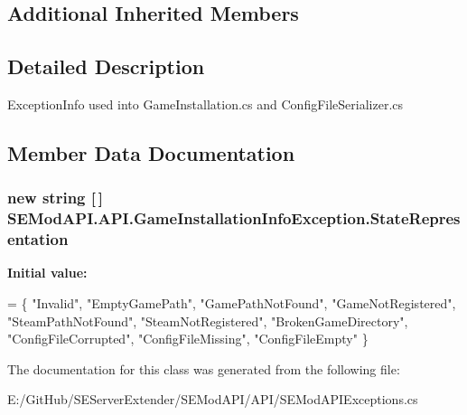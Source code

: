 \subsection*{Additional Inherited Members}


\subsection{Detailed Description}
Exception\+Info used into Game\+Installation.\+cs and Config\+File\+Serializer.\+cs 

\subsection{Member Data Documentation}
\hypertarget{class_s_e_mod_a_p_i_1_1_a_p_i_1_1_game_installation_info_exception_a82eeaa84fbce2623ff4624282c7d0e14}{}
\subsubsection[{State\+Representation}]{\setlength{\rightskip}{0pt plus 5cm}new string \mbox{[}$\,$\mbox{]} S\+E\+Mod\+A\+P\+I.\+A\+P\+I.\+Game\+Installation\+Info\+Exception.\+State\+Representation}\label{class_s_e_mod_a_p_i_1_1_a_p_i_1_1_game_installation_info_exception_a82eeaa84fbce2623ff4624282c7d0e14}
{\bfseries Initial value\+:}
\begin{DoxyCode}
=
        \{
            \textcolor{stringliteral}{"Invalid"},
            \textcolor{stringliteral}{"EmptyGamePath"},
            \textcolor{stringliteral}{"GamePathNotFound"},
            \textcolor{stringliteral}{"GameNotRegistered"},
            \textcolor{stringliteral}{"SteamPathNotFound"},
            \textcolor{stringliteral}{"SteamNotRegistered"},
            \textcolor{stringliteral}{"BrokenGameDirectory"},
            \textcolor{stringliteral}{"ConfigFileCorrupted"},
            \textcolor{stringliteral}{"ConfigFileMissing"},
            \textcolor{stringliteral}{"ConfigFileEmpty"}
        \}
\end{DoxyCode}


The documentation for this class was generated from the following file\+:\begin{DoxyCompactItemize}
\item 
E\+:/\+Git\+Hub/\+S\+E\+Server\+Extender/\+S\+E\+Mod\+A\+P\+I/\+A\+P\+I/S\+E\+Mod\+A\+P\+I\+Exceptions.\+cs\end{DoxyCompactItemize}
